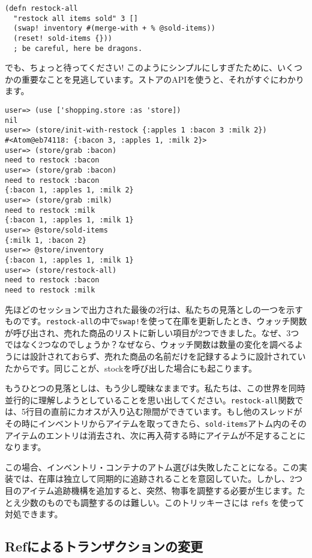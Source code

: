 \begin{lstlisting}[numbers=none]
(defn restock-all
  "restock all items sold" 3 []
  (swap! inventory #(merge-with + % @sold-items))
  (reset! sold-items {}))
  ; be careful, here be dragons.
\end{lstlisting}

でも、ちょっと待ってください! このようにシンプルにしすぎたために、いくつかの重要なことを見逃しています。ストアのAPIを使うと、それがすぐにわかります。


\begin{lstlisting}[numbers=none]
user=> (use ['shopping.store :as 'store])
nil
user=> (store/init-with-restock {:apples 1 :bacon 3 :milk 2})
#<Atom@eb74118: {:bacon 3, :apples 1, :milk 2}>
user=> (store/grab :bacon)
need to restock :bacon
user=> (store/grab :bacon)
need to restock :bacon
{:bacon 1, :apples 1, :milk 2}
user=> (store/grab :milk)
need to restock :milk
{:bacon 1, :apples 1, :milk 1}
user=> @store/sold-items
{:milk 1, :bacon 2}
user=> @store/inventory
{:bacon 1, :apples 1, :milk 1}
user=> (store/restock-all)
need to restock :bacon
need to restock :milk
\end{lstlisting}

先ほどのセッションで出力された最後の2行は、私たちの見落としの一つを示すものです。\texttt{restock-all}の中で\texttt{swap!}を使って在庫を更新したとき、ウォッチ関数が呼び出され、売れた商品のリストに新しい項目が2つできました。なぜ、3つではなく2つなのでしょうか？なぜなら、ウォッチ関数は数量の変化を調べるようには設計されておらず、売れた商品の名前だけを記録するように設計されていたからです。同じことが、stockを呼び出した場合にも起こります。

もうひとつの見落としは、もう少し曖昧なままです。私たちは、この世界を同時並行的に理解しようとしていることを思い出してください。\texttt{restock-all}関数では、5行目の直前にカオスが入り込む隙間ができています。もし他のスレッドがその時にインベントリからアイテムを取ってきたら、\texttt{sold-items}アトム内のそのアイテムのエントリは消去され、次に再入荷する時にアイテムが不足することになります。

この場合、インベントリ・コンテナのアトム選びは失敗したことになる。この実装では、在庫は独立して同期的に追跡されることを意図していた。しかし、2つ目のアイテム追跡機構を追加すると、突然、物事を調整する必要が生じます。たとえ少数のものでも調整するのは難しい。このトリッキーさには \texttt{refs} を使って対処できます。

\subsection{Refによるトランザクションの変更}

